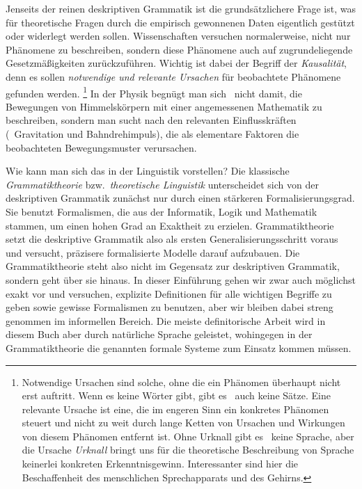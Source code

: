 Jenseits der reinen deskriptiven Grammatik ist die grundsätzlichere Frage ist, was für theoretische Fragen durch die empirisch gewonnenen Daten eigentlich gestützt oder widerlegt werden sollen.
Wissenschaften versuchen normalerweise, nicht nur Phänomene zu beschreiben, sondern diese Phänomene auch auf zugrundeliegende Gesetzmäßigkeiten zurückzuführen.
Wichtig ist dabei der Begriff der \textit{Kausalität}, denn es sollen \textit{notwendige und relevante Ursachen} für beobachtete Phänomene gefunden werden.%
\footnote{Notwendige Ursachen sind solche, ohne die ein Phänomen überhaupt nicht erst auftritt.
Wenn es keine Wörter gibt, gibt es \zB\ auch keine Sätze.
Eine relevante Ursache ist eine, die im engeren Sinn ein konkretes Phänomen steuert und nicht zu weit durch lange Ketten von Ursachen und Wirkungen von diesem Phänomen entfernt ist.
Ohne Urknall gibt es \zB\ keine Sprache, aber die Ursache \textit{Urknall} bringt uns für die theoretische Beschreibung von Sprache keinerlei konkreten Erkenntnisgewinn.
Interessanter sind hier die Beschaffenheit des menschlichen Sprechapparats und des Gehirns.}
In der Physik begnügt man sich \zB\ nicht damit, die Bewegungen von Himmelskörpern mit einer angemessenen Mathematik zu beschreiben, sondern man sucht nach den relevanten Einflusskräften (\zB\ Gravitation und Bahndrehimpuls), die als elementare Faktoren die beobachteten Bewegungsmuster verursachen.

Wie kann man sich das in der Linguistik vorstellen?
Die klassische \textit{Grammatiktheorie} bzw.\ \textit{theoretische Linguistik} unterscheidet sich von der deskriptiven Grammatik zunächst nur durch einen stärkeren Formalisierungsgrad.
Sie benutzt Formalismen, die aus der Informatik, Logik und Mathematik stammen, um einen hohen Grad an Exaktheit zu erzielen.
Grammatiktheorie setzt die deskriptive Grammatik also als ersten Generalisierungsschritt voraus und versucht, präzisere formalisierte Modelle darauf aufzubauen.
Die Grammatiktheorie steht also nicht im Gegensatz zur deskriptiven Grammatik, sondern geht über sie hinaus.
In dieser Einführung gehen wir zwar auch möglichst exakt vor und versuchen, explizite Definitionen für alle wichtigen Begriffe zu geben sowie gewisse Formalismen zu benutzen, aber wir bleiben dabei streng genommen im informellen Bereich.
Die meiste definitorische Arbeit wird in diesem Buch aber durch natürliche Sprache geleistet, wohingegen in der Grammatiktheorie die genannten formale Systeme zum Einsatz kommen müssen.

